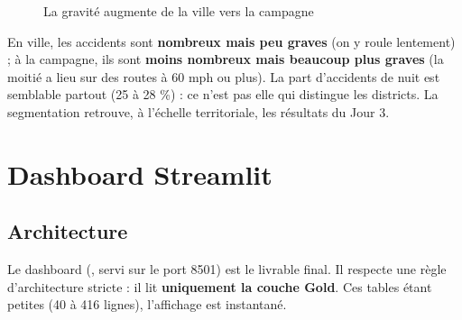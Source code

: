 \documentclass[11pt,a4paper]{report}
\newcommand{\code}[1]{\texttt{\detokenize{#1}}}
\begin{document}
\begin{figure}[H]
\centering
{}
\caption{La gravité augmente de la ville vers la campagne}
\end{figure}

\begin{keybox}[Interprétation]
En ville, les accidents sont \textbf{nombreux mais peu graves} (on y roule lentement) ; à la campagne, ils sont \textbf{moins nombreux mais beaucoup plus graves} (la moitié a lieu sur des routes à 60 mph ou plus). La part d'accidents de nuit est semblable partout (25 à 28 \%) : ce n'est pas elle qui distingue les districts. La segmentation retrouve, à l'échelle territoriale, les résultats du Jour 3.
\end{keybox}

\section{Dashboard Streamlit}

\subsection{Architecture}

Le dashboard (\code{app/dashboard.py}, servi sur le port 8501) est le livrable final. Il respecte une règle d'architecture stricte : il lit \textbf{uniquement la couche Gold}. Ces tables étant petites (40 à 416 lignes), l'affichage est instantané.
\end{document}
